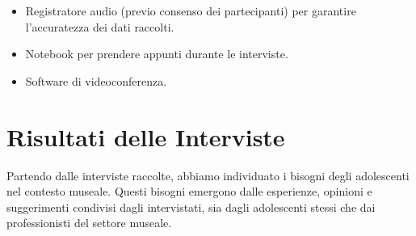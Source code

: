 \documentclass{article}
\begin{document}
\begin{itemize}
    \item Registratore audio (previo consenso dei partecipanti) per garantire l'accuratezza dei dati raccolti.
    \item Notebook per prendere appunti durante le interviste.
    \item Software di videoconferenza.
\end{itemize}

\section{Risultati delle Interviste}
Partendo dalle interviste raccolte, abbiamo individuato i bisogni degli adolescenti nel contesto museale. Questi bisogni emergono dalle esperienze, opinioni e suggerimenti condivisi dagli intervistati, sia dagli adolescenti stessi che dai professionisti del settore museale.
\end{document}

